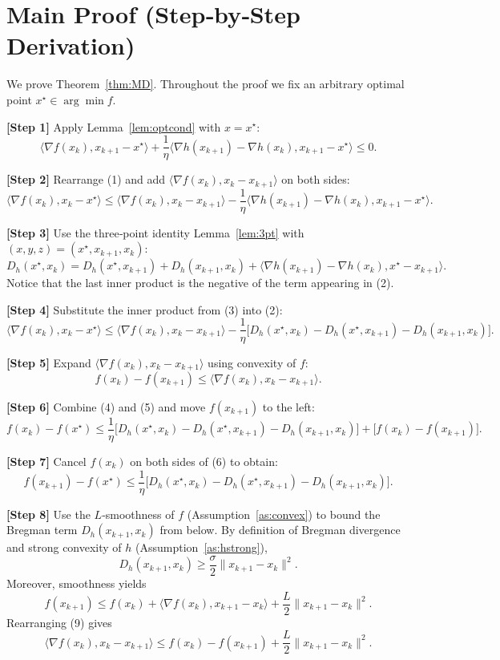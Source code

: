 \documentclass{article}
\newcommand{\inner}[2]{\langle #1,#2\rangle}
\newcommand{\grad}{\nabla}
\newcommand{\Breg}[2]{D_h(#1,#2)}
\begin{document}
\section*{Main Proof (Step‑by‑Step Derivation)}
We prove Theorem~\ref{thm:MD}. Throughout the proof we fix an arbitrary optimal point $x^{\star}\in\arg\min f$.

\bigskip
\noindent\textbf{[Step 1]} Apply Lemma~\ref{lem:optcond} with $x=x^{\star}$:
\[
\inner{\grad f(x_k)}{x_{k+1}-x^{\star}}+ \frac{1}{\eta}\inner{\grad h(x_{k+1})-\grad h(x_k)}{x_{k+1}-x^{\star}}\le 0 .
\tag{1}
\]

\noindent\textbf{[Step 2]} Rearrange (1) and add $\inner{\grad f(x_k)}{x_k-x_{k+1}}$ on both sides:
\[
\inner{\grad f(x_k)}{x_k-x^{\star}} \le
\inner{\grad f(x_k)}{x_k-x_{k+1}}-\frac{1}{\eta}\inner{\grad h(x_{k+1})-\grad h(x_k)}{x_{k+1}-x^{\star}} .
\tag{2}
\]

\noindent\textbf{[Step 3]} Use the three‑point identity Lemma~\ref{lem:3pt} with $(x,y,z)=(x^{\star},x_{k+1},x_k)$:
\[
\Breg{x^{\star}}{x_k}= \Breg{x^{\star}}{x_{k+1}}+ \Breg{x_{k+1}}{x_k}+ \inner{\grad h(x_{k+1})-\grad h(x_k)}{x^{\star}-x_{k+1}} .
\tag{3}
\]
Notice that the last inner product is the negative of the term appearing in (2).

\noindent\textbf{[Step 4] } Substitute the inner product from (3) into (2):
\[
\inner{\grad f(x_k)}{x_k-x^{\star}}
\le \inner{\grad f(x_k)}{x_k-x_{k+1}}-\frac{1}{\eta}\bigl[\Breg{x^{\star}}{x_k}-\Breg{x^{\star}}{x_{k+1}}-\Breg{x_{k+1}}{x_k}\bigr].
\tag{4}
\]

\noindent\textbf{[Step 5] } Expand $\inner{\grad f(x_k)}{x_k-x_{k+1}}$ using convexity of $f$:
\[
f(x_k)-f(x_{k+1})\le \inner{\grad f(x_k)}{x_k-x_{k+1}} .
\tag{5}
\]

\noindent\textbf{[Step 6] } Combine (4) and (5) and move $f(x_{k+1})$ to the left:
\[
f(x_k)-f(x^{\star}) \le
\frac{1}{\eta}\bigl[\Breg{x^{\star}}{x_k}-\Breg{x^{\star}}{x_{k+1}}-\Breg{x_{k+1}}{x_k}\bigr]
+ \bigl[f(x_k)-f(x_{k+1})\bigr] .
\tag{6}
\]

\noindent\textbf{[Step 7] } Cancel $f(x_k)$ on both sides of (6) to obtain:
\[
f(x_{k+1})-f(x^{\star}) \le
\frac{1}{\eta}\bigl[\Breg{x^{\star}}{x_k}-\Breg{x^{\star}}{x_{k+1}}-\Breg{x_{k+1}}{x_k}\bigr].
\tag{7}
\]

\noindent\textbf{[Step 8] } Use the $L$‑smoothness of $f$ (Assumption~\ref{as:convex}) to bound the Bregman term $\Breg{x_{k+1}}{x_k}$ from below. By definition of Bregman divergence and strong convexity of $h$ (Assumption~\ref{as:hstrong}),
\[
\Breg{x_{k+1}}{x_k}\ge \frac{\sigma}{2}\|x_{k+1}-x_k\|^{2}.
\tag{8}
\]
Moreover, smoothness yields
\[
f(x_{k+1})\le f(x_k)+\inner{\grad f(x_k)}{x_{k+1}-x_k}+\frac{L}{2}\|x_{k+1}-x_k\|^{2}.
\tag{9}
\]
Rearranging (9) gives
\[
\inner{\grad f(x_k)}{x_k-x_{k+1}}\le f(x_k)-f(x_{k+1})+\frac{L}{2}\|x_{k+1}-x_k\|^{2}.
\tag{10}
\]
\end{document}
